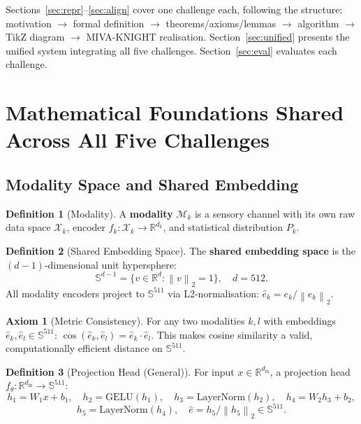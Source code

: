 \documentclass[12pt,a4paper]{article}
\theoremstyle{definition}
\newtheorem{definition}{Definition}[section]
\newtheorem{axiom}{Axiom}[section]
\theoremstyle{plain}
\theoremstyle{remark}
\newcommand{\R}{\mathbb{R}}
\newcommand{\Sph}{\mathbb{S}}
\newcommand{\Norm}[1]{\left\|#1\right\|}
\newcommand{\LN}{\mathrm{LayerNorm}}
\newcommand{\GELU}{\mathrm{GELU}}
\begin{document}
Sections~\ref{sec:repr}--\ref{sec:align} cover one challenge each, following the structure: motivation $\to$ formal definition $\to$ theorems/axioms/lemmas $\to$ algorithm $\to$ TikZ diagram $\to$ MIVA-KNIGHT realisation. Section~\ref{sec:unified} presents the unified system integrating all five challenges. Section~\ref{sec:eval} evaluates each challenge.

\newpage
\section{Mathematical Foundations Shared Across All Five Challenges}
\label{sec:foundations}

\subsection{Modality Space and Shared Embedding}

\begin{definition}[Modality]
A \textbf{modality} $\mathcal{M}_k$ is a sensory channel with its own raw data space $\mathcal{X}_k$, encoder $f_k : \mathcal{X}_k \to \R^{d_k}$, and statistical distribution $P_k$.
\end{definition}

\begin{definition}[Shared Embedding Space]
The \textbf{shared embedding space} is the $(d{-}1)$-dimensional unit hypersphere:
\[
  \Sph^{d-1} = \{v \in \R^d : \Norm{v}_2 = 1\}, \quad d = 512.
\]
All modality encoders project to $\Sph^{511}$ via L2-normalisation: $\hat{e}_k = e_k / \Norm{e_k}_2$.
\end{definition}

\begin{axiom}[Metric Consistency]
\label{ax:metric}
For any two modalities $k, l$ with embeddings $\hat{e}_k, \hat{e}_l \in \Sph^{511}$:
$\cos(\hat{e}_k, \hat{e}_l) = \hat{e}_k \cdot \hat{e}_l$.
This makes cosine similarity a valid, computationally efficient distance on $\Sph^{511}$.
\end{axiom}

\begin{definition}[Projection Head (General)]
\label{def:projhead}
For input $x \in \R^{d_{\text{in}}}$, a projection head $f_\theta : \R^{d_{\text{in}}} \to \Sph^{511}$:
\[
  h_1 = W_1 x + b_1,\quad h_2 = \GELU(h_1),\quad h_3 = \LN(h_2),\quad h_4 = W_2 h_3 + b_2,
\]
\[
  h_5 = \LN(h_4),\quad \hat{e} = h_5 / \Norm{h_5}_2 \in \Sph^{511}.
\]
\end{definition}
\end{document}
